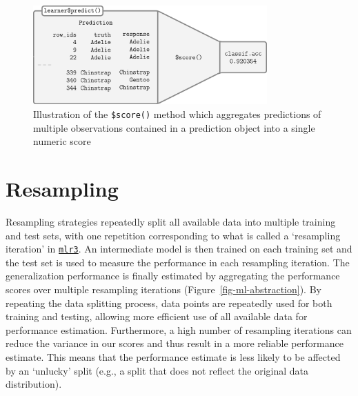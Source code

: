 \begin{figure}

{\centering \includegraphics[width=0.8\textwidth,height=\textheight]{chapters/chapter3/Figures/mlr3book_figures-3.png}

}

\caption{\label{fig-score}Illustration of the \texttt{\$score()} method
which aggregates predictions of multiple observations contained in a
prediction object into a single numeric score}

\end{figure}

\hypertarget{sec-resampling}{%
\section{Resampling}\label{sec-resampling}}

Resampling strategies repeatedly split all available
data into multiple training and test sets, with one repetition
corresponding to what is called a `resampling iteration' in
\href{https://mlr3.mlr-org.com}{\texttt{mlr3}}. An
intermediate model is then trained on each training set and the test set
is used to measure the performance in each resampling iteration. The
generalization performance is finally estimated by aggregating the
performance scores over multiple resampling iterations
(Figure~\ref{fig-ml-abstraction}). By repeating the data splitting
process, data points are repeatedly used for both training and testing,
allowing more efficient use of all available data for performance
estimation. Furthermore, a high number of resampling iterations can
reduce the variance in our scores and thus result in a more reliable
performance estimate. This means that the performance estimate is less
likely to be affected by an `unlucky' split (e.g., a split that does not
reflect the original data distribution).

